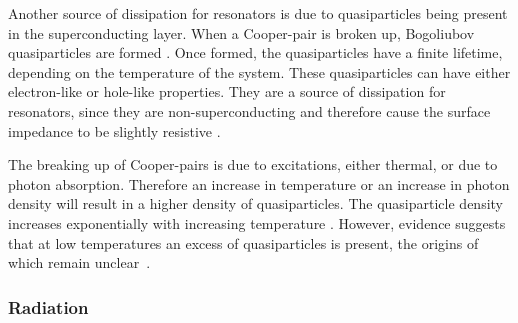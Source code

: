       Another source of dissipation for resonators is due to quasiparticles being present in the superconducting layer. When a Cooper-pair is broken up, Bogoliubov quasiparticles are formed \cite[p16]{Barends}. Once formed, the quasiparticles have a finite lifetime, depending on the temperature of the system. These quasiparticles can have either electron-like or hole-like properties. They are a source of dissipation for resonators, since they are non-superconducting and therefore cause the surface impedance to be slightly resistive \cite[p18]{Mazin}.

      The breaking up of Cooper-pairs is due to excitations, either thermal, or due to photon absorption. Therefore an increase in temperature or an increase in photon density will result in a higher density of quasiparticles. The quasiparticle density increases exponentially with increasing temperature \cite[p44]{Mazin}. However, evidence suggests that at low temperatures an excess of quasiparticles is present, the origins of which remain unclear~\cite{de2011number}.





    \subsubsection{Radiation}

